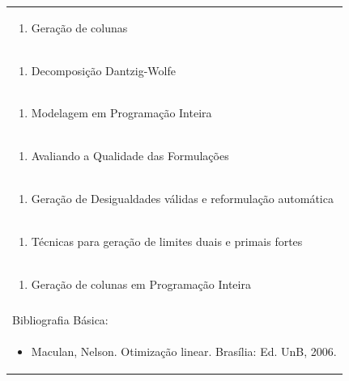 \documentclass[11pt]{article}
\begin{document}
\begin{center}
\begin{longtable}{|p{4cm}|p{4cm}|p{4cm}|p{4cm}|}
\multicolumn{4}{|p{\dimexpr 16cm + 6\tabcolsep\relax}|}{\begin{enumerate}[start=9]\item Geração de colunas\end{enumerate}}\\
\multicolumn{4}{|p{\dimexpr 16cm + 6\tabcolsep\relax}|}{\begin{enumerate}[start=10]\item Decomposição Dantzig-Wolfe\end{enumerate}}\\
\multicolumn{4}{|p{\dimexpr 16cm + 6\tabcolsep\relax}|}{\begin{enumerate}[start=11]\item Modelagem em Programação Inteira\end{enumerate}}\\
\multicolumn{4}{|p{\dimexpr 16cm + 6\tabcolsep\relax}|}{\begin{enumerate}[start=12]\item Avaliando a Qualidade das Formulações\end{enumerate}}\\
\multicolumn{4}{|p{\dimexpr 16cm + 6\tabcolsep\relax}|}{\begin{enumerate}[start=13]\item Geração de Desigualdades válidas e reformulação automática\end{enumerate}}\\
\multicolumn{4}{|p{\dimexpr 16cm + 6\tabcolsep\relax}|}{\begin{enumerate}[start=14]\item Técnicas para geração de limites duais e primais fortes\end{enumerate}}\\
\multicolumn{4}{|p{\dimexpr 16cm + 6\tabcolsep\relax}|}{\begin{enumerate}[start=15]\item Geração de colunas em Programação Inteira\end{enumerate}}\\
\multicolumn{4}{|p{\dimexpr 16cm + 6\tabcolsep\relax}|}{}\\
\hline
\multicolumn{4}{|p{16cm}|}{Bibliografia Básica:}\\*
\multicolumn{4}{|p{\dimexpr 16cm + 6\tabcolsep\relax}|}{\begin{itemize}\item Maculan, Nelson. Otimização linear. Brasília: Ed. UnB, 2006.\end{itemize}}\\

\end{longtable}
\end{center}
\end{document}
